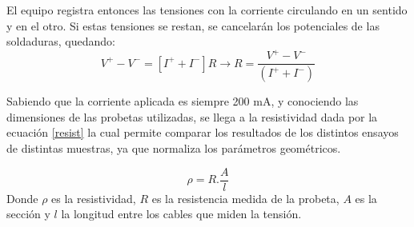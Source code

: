 \documentclass[a4paper,12pt,fleqn,twoside,openany]{book}
\begin{document}
El equipo registra entonces las tensiones con la corriente circulando en un sentido y en el otro. Si estas tensiones se restan, se cancelarán los potenciales 
de las soldaduras, quedando:  
\begin{equation}
 V^+ - V^-= [I^+ + I^-] R \longrightarrow R=\frac{V^+ - V^-}{(I^+ + I^-)}
\end{equation}

Sabiendo que la corriente aplicada es siempre 200 mA, y conociendo las dimensiones de las probetas utilizadas, se llega a la resistividad dada por la 
ecuación \ref{resist} la cual permite comparar los resultados de los distintos ensayos de distintas muestras, ya que normaliza los parámetros geométricos.

\begin{equation}
 \rho = R . \frac{A}{l} \label{resist} 
\end{equation}
Donde $\rho$ es la resistividad, $R$ es la resistencia medida de la probeta, $A$ es la sección y $l$ la longitud entre los cables que miden la tensión.

 
 
\end{document}
